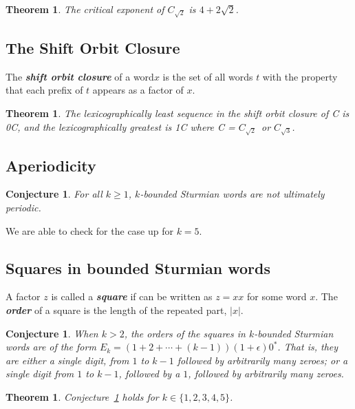 \documentclass[a4paper]{article}
\newcommand{\word}{word\xspace}
\newcommand{\factor}{factor\xspace}
\newcommand{\term}[1]{\emph{\textbf{#1}}}
\newcommand{\Ctwo}{\ensuremath{C_{\sqrt{2}}}}
\newcommand{\Cthree}{\ensuremath{C_{\sqrt{3}}}}
\theoremstyle{definition}
\theoremstyle{remark}
\theoremstyle{remark}
\theoremstyle{plain}
\newtheorem{theorem}[definition]{Theorem}
\newtheorem{conjecture}[definition]{Conjecture}
\begin{document}
\begin{theorem}
The critical exponent of $C_{\sqrt{2}}$ is $4 + 2\sqrt{2}$.
\end{theorem}

\subsection{The Shift Orbit Closure}

The \term{shift orbit closure} of a \word $x$ is the set of all \word{}s $t$ with the property that each prefix of $t$ appears as a \factor of $x$.

\begin{theorem}
The lexicographically least sequence in the shift orbit closure of C is 0C, and the lexicographically greatest is 1C where C = \Ctwo\ or \Cthree. 
\end{theorem}

\subsection{Aperiodicity}

\begin{conjecture}
For all $k \ge 1$, $k$-bounded Sturmian words are not ultimately periodic.
\end{conjecture}

We are able to check for the case up for $k=5$.

\subsection{Squares in bounded Sturmian words}

A factor $z$ is called a \term{square} if can be written as $z = xx$ for some word $x$.
The \term{order} of a square is the length of the repeated part, $|x|$.

\begin{conjecture}\label{conj:square}
    When $k > 2$, the orders of the squares in $k$-bounded Sturmian words are of the form $E_k = (1+2+\cdots+(k-1))(1+\epsilon)0^*$.
    That is, they are either a single digit, from $1$ to $k-1$ followed by arbitrarily many zeroes; or a single digit from $1$ to $k-1$, followed by a $1$, followed by arbitrarily many zeroes.
\end{conjecture}

\begin{theorem}\label{thm:square-conj-prf}
Conjecture~\ref{conj:square} holds for $k \in \{1,2,3,4,5\}$.
\end{theorem}
\end{document}
